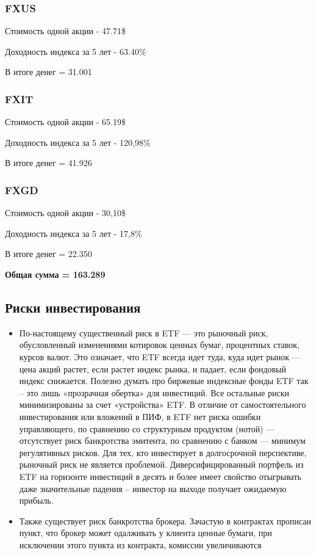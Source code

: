 \subsubsection{FXUS}

Стоимость одной акции - 47.71\$

Доходность индекса за 5 лет - 63.40\%

В итоге денег = 31.001

\subsubsection{FXIT}

Стоимость одной акции - 65.19\$

Доходность индекса за 5 лет - 120,98\%

В итоге денег = 41.926

\subsubsection{FXGD}

Стоимость одной акции - 30,10\$

Доходность индекса за 5 лет - 17,8\%

В итоге денег = 22.350


\textbf{Общая сумма = 163.289}

\subsection{Риски инвестирования}

\begin{itemize}
	\item По-настоящему существенный риск в ETF ­­— это рыночный риск, обусловленный изменениями котировок ценных бумаг, процентных ставок, курсов валют. Это означает, что ETF всегда идет туда, куда идет рынок — цена акций растет, если растет индекс рынка, и падает, если фондовый индекс снижается. Полезно думать про биржевые индексные фонды ETF так – это лишь «прозрачная обертка» для инвестиций. Все остальные риски минимизированы за счет «устройства» ETF. В отличие от самостоятельного инвестирования или вложений в ПИФ, в ETF нет риска ошибки управляющего, по сравнению со структурным продуктом (нотой) — отсутствует риск банкротства эмитента, по сравнению с банком — минимум регулятивных рисков. Для тех, кто инвестирует в долгосрочной перспективе, рыночный риск не является  проблемой. Диверсифицированный портфель из ETF на горизонте инвестиций в десять и более имеет свойство отыгрывать даже значительные падения – инвестор на выходе получает ожидаемую прибыль.
	\item Также существует риск банкротства брокера. Зачастую в контрактах прописан пункт, что брокер может одалживать у клиента ценные бумаги, при исключении этого пункта из контракта, комиссии увеличиваются
\end{itemize}

